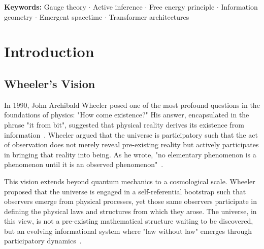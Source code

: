\documentclass[11pt]{article}
\begin{document}
\begin{abstract}
Separately, we outline speculative extensions: a pullback information-geometric construction for cognitive reference frames in the Lahav-Neemeh sense (Section~\ref{sec:lahav_convergence}); a meta-agent renormalization scheme whose continuous variational criterion is not yet empirically validated against the discrete detector (Section~\ref{sec:meta_agent_threshold}); and a 2D abelian-exact $\mathrm{GL}(K_q, \mathbb{C})$ worked example yielding an $\mathrm{SO}(1,1)$-compatible indefinite pullback metric under an imposed imaginary temporal generator and a real-part projection (Section~\ref{sec:signature_resolution}). The four-dimensional nonlinear extension, dynamical selection of the imaginary generator, dimensional analysis between informational and physical units, and a rigorous quantum extension are open; the gauge-orbit-averaged consensus metric used as the framework's candidate gauge-invariant geometry is also conditional on a regulator that we do not construct (Section~\ref{sec:consensus_metric}). We state these limitations explicitly in Section~\ref{sec:scope_limitations}.
\end{abstract}

\noindent\textbf{Keywords:} Gauge theory $\cdot$ Active inference $\cdot$ Free energy principle $\cdot$ Information geometry $\cdot$ Emergent spacetime $\cdot$ Transformer architectures

\tableofcontents
\clearpage

\section{Introduction}

\subsection{Wheeler's Vision}

In 1990, John Archibald Wheeler posed one of the most profound questions in the foundations of physics: "How come existence?" His answer, encapsulated in the phrase "it from bit", suggested that physical reality derives its existence from information~\cite{Wheeler1990}. Wheeler argued that the universe is participatory such that the act of observation does not merely reveal pre-existing reality but actively participates in bringing that reality into being. As he wrote, "no elementary phenomenon is a phenomenon until it is an observed phenomenon"~\cite{Wheeler1983}.

This vision extends beyond quantum mechanics to a cosmological scale. Wheeler proposed that the universe is engaged in a self-referential bootstrap such that observers emerge from physical processes, yet those same observers participate in defining the physical laws and structures from which they arose. The universe, in this view, is not a pre-existing mathematical structure waiting to be discovered, but an evolving informational system where "law without law" emerges through participatory dynamics~\cite{Wheeler1983}.
\end{document}

